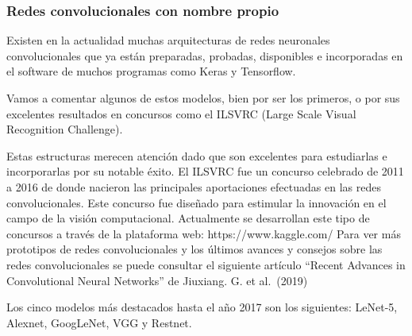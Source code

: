\documentclass[
  a4paper,
  DIV=11,
  numbers=noendperiod]{scrreprt}
\begin{document}
\subsubsection{Redes convolucionales con nombre
propio}\label{redes-convolucionales-con-nombre-propio}

Existen en la actualidad muchas arquitecturas de redes neuronales
convolucionales que ya están preparadas, probadas, disponibles e
incorporadas en el software de muchos programas como Keras y Tensorflow.

Vamos a comentar algunos de estos modelos, bien por ser los primeros, o
por sus excelentes resultados en concursos como el ILSVRC (Large Scale
Visual Recognition Challenge).

Estas estructuras merecen atención dado que son excelentes para
estudiarlas e incorporarlas por su notable éxito. El ILSVRC fue un
concurso celebrado de 2011 a 2016 de donde nacieron las principales
aportaciones efectuadas en las redes convolucionales. Este concurso fue
diseñado para estimular la innovación en el campo de la visión
computacional. Actualmente se desarrollan este tipo de concursos a
través de la plataforma web: https://www.kaggle.com/ Para ver más
prototipos de redes convolucionales y los últimos avances y consejos
sobre las redes convolucionales se puede consultar el siguiente artículo
``Recent Advances in Convolutional Neural Networks'' de Jiuxiang. G. et
al.~(2019)

Los cinco modelos más destacados hasta el año 2017 son los siguientes:
LeNet-5, Alexnet, GoogLeNet, VGG y Restnet.
\end{document}
